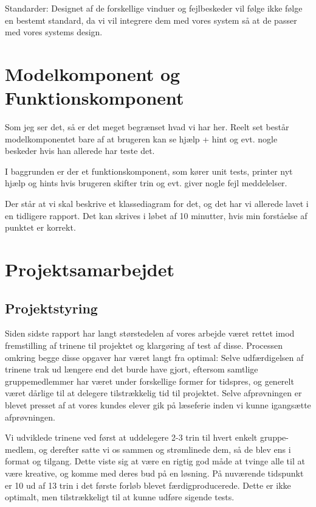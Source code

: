 \documentclass[10pt,a4paper,danish]{article}
\begin{document}
Standarder: Designet af de forskellige vinduer og fejlbeskeder vil følge ikke følge 
en bestemt standard, da vi vil integrere dem med vores system så at de passer med 
vores systems design. 


\section{Modelkomponent og Funktionskomponent}

Som jeg ser det, så er det meget begrænset hvad vi har her. Reelt set består
modelkomponentet bare af at brugeren kan se hjælp + hint og evt. nogle beskeder
hvis han allerede har teste det. 

I baggrunden er der et funktionskomponent, som kører unit tests, printer nyt
hjælp og hints hvis brugeren skifter trin og evt. giver nogle fejl meddelelser. 

Der står at vi skal beskrive et klassediagram for det, og det har vi allerede
lavet i en tidligere rapport. Det kan skrives i løbet af 10 minutter, hvis min
forståelse af punktet er korrekt. 

\section{Projektsamarbejdet}
\subsection{Projektstyring}
Siden sidste rapport har langt størstedelen af vores arbejde været rettet imod
fremstilling af trinene til projektet og klargøring af test af disse. Processen
omkring begge disse opgaver har været langt fra optimal: Selve udfærdigelsen af 
trinene trak ud længere end det burde have gjort, eftersom samtlige gruppemedlemmer
har været under forskellige former for tidspres, og generelt været dårlige til 
at delegere tilstrækkelig tid til projektet. Selve afprøvningen er blevet presset
af at vores kundes elever gik på læseferie inden vi kunne igangsætte afprøvningen. 

Vi udviklede trinene ved først at uddelegere 2-3 trin til hvert enkelt gruppe-
medlem, og derefter satte vi os sammen og strømlinede dem, så de blev ens i
format og tilgang. Dette viste sig at være en rigtig god måde at tvinge alle
til at være kreative, og komme med deres bud på en løsning. På nuværende tidspunkt
er 10 ud af 13 trin i det første forløb blevet færdigproducerede. Dette er ikke 
optimalt, men tilstrækkeligt til at kunne udføre sigende tests.
\end{document}
